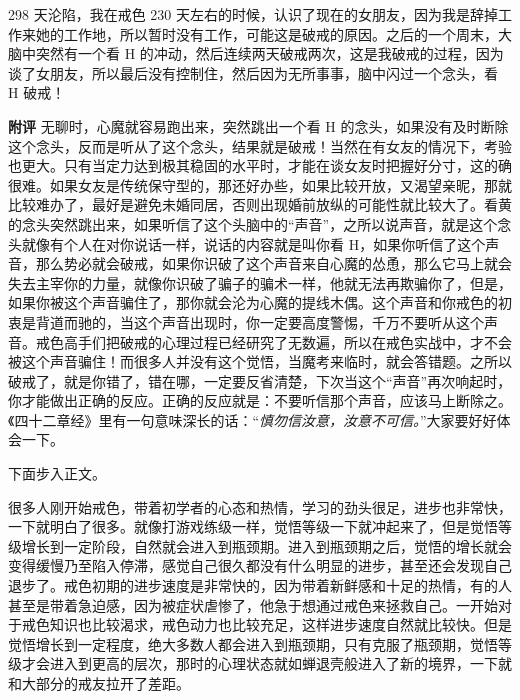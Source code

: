 \begin{case}
    298 天沦陷，我在戒色 230 天左右的时候，认识了现在的女朋友，因为我是辞掉工作来她的工作地，所以暂时没有工作，可能这是破戒的原因。之后的一个周末，大脑中突然有一个看 H 的冲动，然后连续两天破戒两次，这是我破戒的过程，因为谈了女朋友，所以最后没有控制住，然后因为无所事事，脑中闪过一个念头，看 H 破戒！

    \textbf{附评} 无聊时，心魔就容易跑出来，突然跳出一个看 H 的念头，如果没有及时断除这个念头，反而是听从了这个念头，结果就是破戒！当然在有女友的情况下，考验也更大。只有当定力达到极其稳固的水平时，才能在谈女友时把握好分寸，这的确很难。如果女友是传统保守型的，那还好办些，如果比较开放，又渴望亲昵，那就比较难办了，最好是避免未婚同居，否则出现婚前放纵的可能性就比较大了。看黄的念头突然跳出来，如果听信了这个头脑中的“声音”，之所以说声音，就是这个念头就像有个人在对你说话一样，说话的内容就是叫你看 H，如果你听信了这个声音，那么势必就会破戒，如果你识破了这个声音来自心魔的怂恿，那么它马上就会失去主宰你的力量，就像你识破了骗子的骗术一样，他就无法再欺骗你了，但是，如果你被这个声音骗住了，那你就会沦为心魔的提线木偶。这个声音和你戒色的初衷是背道而驰的，当这个声音出现时，你一定要高度警惕，千万不要听从这个声音。戒色高手们把破戒的心理过程已经研究了无数遍，所以在戒色实战中，才不会被这个声音骗住！而很多人并没有这个觉悟，当魔考来临时，就会答错题。之所以破戒了，就是你错了，错在哪，一定要反省清楚，下次当这个“声音”再次响起时，你才能做出正确的反应。正确的反应就是：不要听信那个声音，应该马上断除之。《四十二章经》里有一句意味深长的话：“\textit{慎勿信汝意，汝意不可信。}”大家要好好体会一下。
\end{case}

下面步入正文。

很多人刚开始戒色，带着初学者的心态和热情，学习的劲头很足，进步也非常快，一下就明白了很多。就像打游戏练级一样，觉悟等级一下就冲起来了，但是觉悟等级增长到一定阶段，自然就会进入到瓶颈期。进入到瓶颈期之后，觉悟的增长就会变得缓慢乃至陷入停滞，感觉自己很久都没有什么明显的进步，甚至还会发现自己退步了。戒色初期的进步速度是非常快的，因为带着新鲜感和十足的热情，有的人甚至是带着急迫感，因为被症状虐惨了，他急于想通过戒色来拯救自己。一开始对于戒色知识也比较渴求，戒色动力也比较充足，这样进步速度自然就比较快。但是觉悟增长到一定程度，绝大多数人都会进入到瓶颈期，只有克服了瓶颈期，觉悟等级才会进入到更高的层次，那时的心理状态就如蝉退壳般进入了新的境界，一下就和大部分的戒友拉开了差距。

